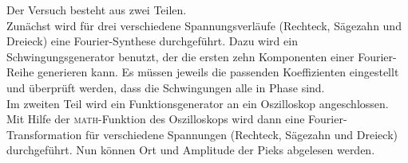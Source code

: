 Der Versuch besteht aus zwei Teilen. \\
Zunächst wird für drei verschiedene Spannungsverläufe (Rechteck, Sägezahn und Dreieck) eine Fourier-Synthese durchgeführt. Dazu wird ein Schwingungsgenerator benutzt, der die ersten zehn Komponenten einer Fourier-Reihe generieren kann. Es müssen jeweils die passenden Koeffizienten eingestellt und überprüft werden, dass die Schwingungen alle in Phase sind. \\
Im zweiten Teil wird ein Funktionsgenerator an ein Oszilloskop angeschlossen. Mit Hilfe der \textsc{math}-Funktion des Oszilloskops wird dann eine Fourier-Transformation für verschiedene Spannungen (Rechteck, Sägezahn und Dreieck) durchgeführt. Nun können Ort und Amplitude der Pieks abgelesen werden.

